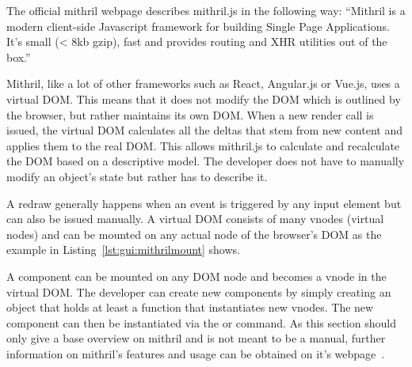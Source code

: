 The   official  mithril   webpage  describes   mithril.js  in   the  following
way: ``Mithril  is  a modern  client-side  Javascript  framework for  building
Single Page Applications. It's  small (< 8kb gzip), fast  and provides routing
and XHR utilities out of the box.''~\cite{mithril:home}

Mithril, like a  lot of other frameworks such as  React, Angular.js or Vue.js,
uses  a virtual  DOM. This means  that it  does not  modify the  DOM which  is
outlined by the  browser, but rather maintains its own  DOM. When a new render
call is issued, the  virtual DOM calculates all the deltas  that stem from new
content and applies them to the  real DOM. This allows mithril.js to calculate
and recalculate the DOM based on  a descriptive model.  The developer does not
have to manually modify an object's state but rather has to describe it.

A redraw generally happens when an event is triggered by any input element but
can also be  issued manually.  A virtual DOM consists  of many vnodes (virtual
nodes) and  can be  mounted on  any actual node  of the  browser's DOM  as the
example in Listing~\ref{lst:gui:mithrilmount} shows.


A component can be mounted on any DOM  node and becomes a vnode in the virtual
DOM. The developer can create new components by simply creating an object that
holds at least a  function that instantiates new vnodes.  The new
component  can then  be instantiated  via the   or  
command.  As this section  should only give a base overview  on mithril and is
not meant to be a manual,  further information on mithril's features and usage
can be obtained on it's webpage~\cite{mithril:home}.
%
%
